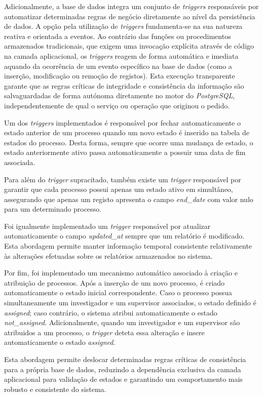 Adicionalmente, a base de dados integra um conjunto de \textit{triggers} responsáveis por automatizar determinadas regras de negócio diretamente ao nível da persistência de dados. A opção pela utilização de \textit{triggers} fundamenta-se na sua natureza reativa e orientada a eventos. Ao contrário das funções ou procedimentos armazenados tradicionais, que exigem uma invocação explícita através de código na camada aplicacional, os \textit{triggers} reagem de forma automática e imediata aquando da ocorrência de um evento específico na base de dados (como a inserção, modificação ou remoção de registos). Esta execução transparente garante que as regras críticas de integridade e consistência da informação são salvaguardadas de forma autónoma diretamente no motor do \textit{PostgreSQL}, independentemente de qual o serviço ou operação que originou o pedido.

Um dos \textit{triggers} implementados é responsável por fechar automaticamente o estado anterior de um processo quando um novo estado é inserido na tabela de estados do processo. Desta forma, sempre que ocorre uma mudança de estado, o estado anteriormente ativo passa automaticamente a possuir uma data de fim associada.

Para além do \textit{trigger} supracitado, também existe um \textit{trigger} responsável por garantir que cada processo possui apenas um estado ativo em simultâneo, assegurando que apenas um registo apresenta o campo \textit{end\_date} com valor nulo para um determinado processo.

Foi igualmente implementado um \textit{trigger} responsável por atualizar automaticamente o campo \textit{updated\_at} sempre que um relatório é modificado. Esta abordagem permite manter informação temporal consistente relativamente às alterações efetuadas sobre os relatórios armazenados no sistema.

Por fim, foi implementado um mecanismo automático associado à criação e atribuição de processos. Após a inserção de um novo processo, é criado automaticamente o estado inicial correspondente. Caso o processo possua simultaneamente um investigador e um supervisor associados, o estado definido é \textit{assigned}; caso contrário, o sistema atribui automaticamente o estado \textit{not\_assigned}. Adicionalmente, quando um investigador e um supervisor são atribuidos a um processo, o \textit{trigger} deteta essa alteração e insere automaticamente o estado \textit{assigned}.

Esta abordagem permite deslocar determinadas regras críticas de consistência para a própria base de dados, reduzindo a dependência exclusiva da camada aplicacional para validação de estados e garantindo um comportamento mais robusto e consistente do sistema.



